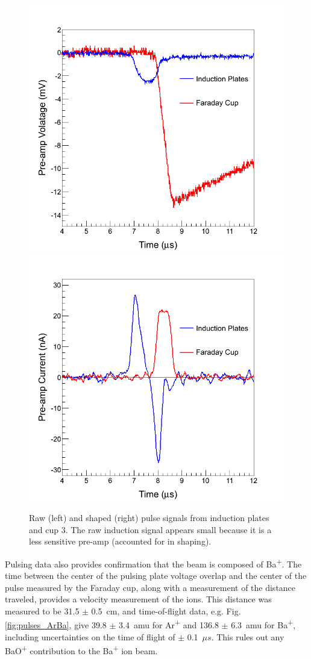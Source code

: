\begin{figure} %
                \includegraphics[width=.49\textwidth]{figures/pulse_ind_cup3_raw.png}
                \includegraphics[width=.49\textwidth]{figures/pulse_ind_cup3_shaped.png}
                \caption{Raw (left) and shaped (right) pulse signals from induction plates and cup 3.  The raw induction signal appears small because it is a less sensitive pre-amp (accounted for in shaping).}
        \label{fig:pulse_raw_shaped}
\end{figure}

Pulsing data also provides confirmation that the beam is composed of Ba\textsuperscript{+}.  The time between the center of the pulsing plate voltage overlap and the center of the pulse measured by the Faraday cup, along with a measurement of the distance traveled, provides a velocity measurement of the ions.  This distance was measured to be 31.5 $\pm$ 0.5~cm, and time-of-flight data, e.g. Fig. \ref{fig:pulses_ArBa}, give 39.8 $\pm$ 3.4~amu for Ar\textsuperscript{+} and 136.8 $\pm$ 6.3~amu for Ba\textsuperscript{+}, including uncertainties on the time of flight of $\pm$ 0.1~$\mu s$.  This rules out any BaO\textsuperscript{+} contribution to the Ba\textsuperscript{+} ion beam.

